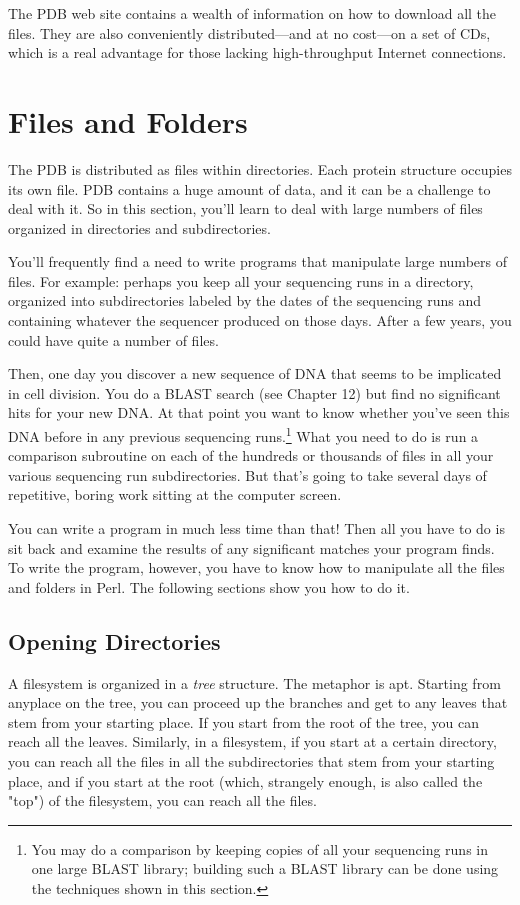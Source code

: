 The PDB web site contains a wealth of information on how to download all the files. They are also conveniently distributed—and at no cost—on a set of CDs, which is a real advantage for those lacking high-throughput Internet connections. 

\section{Files and Folders}
The PDB is distributed as files within directories. Each protein structure occupies its own file. PDB contains a huge amount of data, and it can be a challenge to deal with it. So in this section, you'll learn to deal with large numbers of files organized in directories and subdirectories.

You'll frequently find a need to write programs that manipulate large numbers of files. For example: perhaps you keep all your sequencing runs in a directory, organized into subdirectories labeled by the dates of the sequencing runs and containing whatever the sequencer produced on those days. After a few years, you could have quite a number of files.

Then, one day you discover a new sequence of DNA that seems to be implicated in cell division. You do a BLAST search (see Chapter 12) but find no significant hits for your new DNA. At that point you want to know whether you've seen this DNA before in any previous sequencing runs.\footnote{You may do a comparison by keeping copies of all your sequencing runs in one large BLAST library; building such a BLAST library can be done using the techniques shown in this section.} What you need to do is run a comparison subroutine on each of the hundreds or thousands of files in all your various sequencing run subdirectories. But that's going to take several days of repetitive, boring work sitting at the computer screen.

You can write a program in much less time than that! Then all you have to do is sit back and examine the results of any significant matches your program finds. To write the program, however, you have to know how to manipulate all the files and folders in Perl. The following sections show you how to do it. 

\subsection{Opening Directories}
A filesystem is organized in a \textit{tree} structure. The metaphor is apt.  Starting from anyplace on the tree, you can proceed up the branches and get to any leaves that stem from your starting place. If you start from the root of the tree, you can reach all the leaves. Similarly, in a filesystem, if you start at a certain directory, you can reach all the files in all the subdirectories that stem from your starting place, and if you start at the root (which, strangely enough, is also called the "top") of the filesystem, you can reach all the files.

